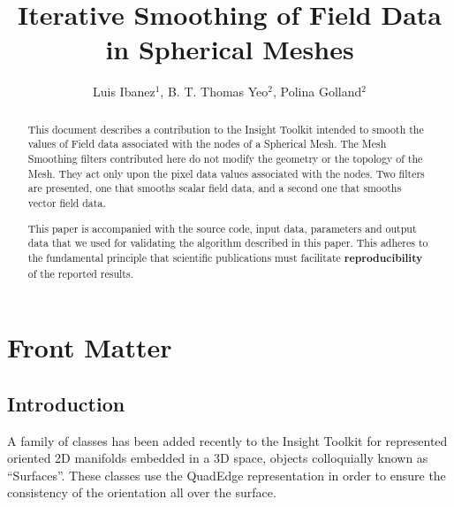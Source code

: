 \documentclass{InsightArticle}
\title{Iterative Smoothing of Field Data\\ in Spherical Meshes}
\author{Luis Ibanez$^{1}$, B. T. Thomas Yeo$^{2}$, Polina Golland$^{2}$}
\newcommand{\IJhandlerIDnumber}{3063}
\begin{document}
%
% 
\IJhandlefooter{\IJhandlerIDnumber}


\ifpdf
\else
\fi


\maketitle


\ifhtml
\chapter*{Front Matter\label{front}}
\fi


\begin{abstract}
\noindent
This document describes a contribution to the Insight Toolkit intended to
smooth the values of Field data associated with the nodes of a Spherical Mesh.
The Mesh Smoothing filters contributed here do not modify the geometry or the
topology of the Mesh. They act only upon the pixel data values associated with
the nodes. Two filters are presented, one that smooths scalar field data, and a
second one that smooths vector field data.

This paper is accompanied with the source code, input data, parameters and
output data that we used for validating the algorithm described in this paper.
This adheres to the fundamental principle that scientific publications must
facilitate \textbf{reproducibility} of the reported results.
\end{abstract}

\tableofcontents

\section{Introduction}

A family of classes has been added recently to the Insight Toolkit for
represented oriented 2D manifolds embedded in a 3D space, objects colloquially
 known as ``Surfaces''. These classes use the QuadEdge representation in order
to ensure the consistency of the orientation all over the surface. 
\end{document}
